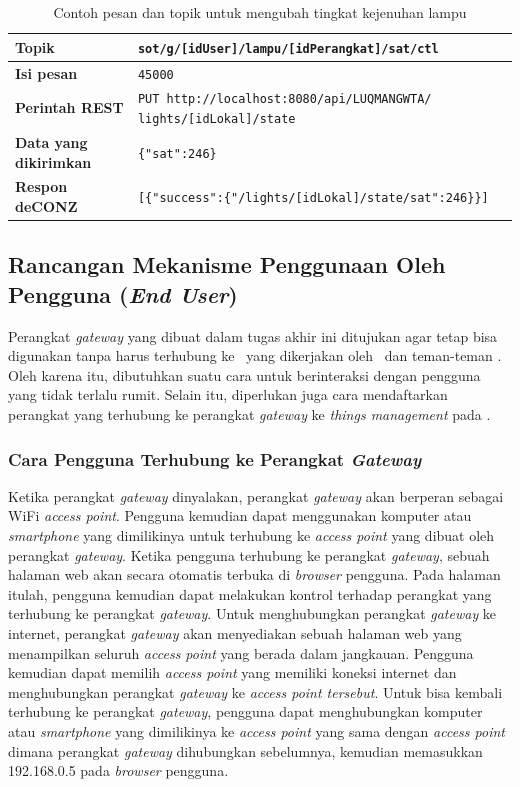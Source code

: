 \begin{enumerate}
	\begin{table}
		\centering
		\caption{Contoh pesan dan topik untuk mengubah tingkat kejenuhan lampu}
		\label{tab:satLampu}
		\begin{tabular}{| l | p{11cm} |}
			\hline
			\textbf{Topik} & \texttt{sot/g/[idUser]/lampu/[idPerangkat]/sat/ctl} \\
			\hline
			\textbf{Isi pesan} & \texttt{45000} \\
			\hline
			\textbf{Perintah REST} & \texttt{PUT http://localhost:8080/api/LUQMANGWTA/ lights/[idLokal]/state} \\
			\hline
			\textbf{Data yang dikirimkan} & \texttt{\{"sat":246\}} \\
			\hline
			\textbf{Respon deCONZ} & \texttt{[\{"success":\{"/lights/[idLokal]/state/sat":246\}\}]} \\
			\hline
		\end{tabular}
	\end{table}
	
\end{enumerate}

\subsection{Rancangan Mekanisme Penggunaan Oleh Pengguna (\textit{End User})}
Perangkat \textit{gateway} yang dibuat dalam tugas akhir ini ditujukan agar tetap bisa digunakan tanpa harus terhubung ke \plat~yang dikerjakan oleh \saya~dan teman-teman \saya. Oleh karena itu, dibutuhkan suatu cara untuk berinteraksi dengan pengguna yang tidak terlalu rumit. Selain itu, diperlukan juga cara mendaftarkan perangkat yang terhubung ke perangkat \textit{gateway} ke \textit{things management} pada \plat.

\subsubsection{Cara Pengguna Terhubung ke Perangkat \textit{Gateway}}
Ketika perangkat \textit{gateway} dinyalakan, perangkat \textit{gateway} akan berperan sebagai WiFi \textit{access point}. Pengguna kemudian dapat menggunakan komputer atau \textit{smartphone} yang dimilikinya untuk terhubung ke \textit{access point} yang dibuat oleh perangkat \textit{gateway}. Ketika pengguna terhubung ke perangkat \textit{gateway}, sebuah halaman web akan secara otomatis terbuka di \textit{browser} pengguna. Pada halaman itulah, pengguna kemudian dapat melakukan kontrol terhadap perangkat yang terhubung ke perangkat \textit{gateway}. Untuk menghubungkan perangkat \textit{gateway} ke internet, perangkat \textit{gateway} akan menyediakan sebuah halaman web yang menampilkan seluruh \textit{access point} yang berada dalam jangkauan. Pengguna kemudian dapat memilih \textit{access point} yang memiliki koneksi internet dan menghubungkan perangkat \textit{gateway} ke \textit{access point tersebut}. Untuk bisa kembali terhubung ke perangkat \textit{gateway}, pengguna dapat menghubungkan komputer atau \textit{smartphone} yang dimilikinya ke \textit{access point} yang sama dengan \textit{access point} dimana perangkat \textit{gateway} dihubungkan sebelumnya, kemudian memasukkan 192.168.0.5 pada \textit{browser} pengguna.

